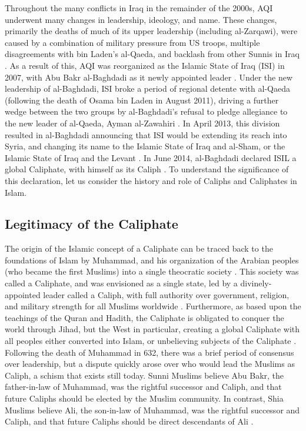 \documentclass{report}
\begin{document}
    Throughout the many conflicts in Iraq in the remainder of the 2000s, AQI underwent many changes in leadership, ideology, and name. These changes, primarily the deaths of much of its upper leadership (including al-Zarqawi), were caused by a combination of military pressure from US troops, multiple disagreements  with bin Laden's al-Qaeda, and backlash from other Sunnis in Iraq \cite{Zelin2014,Kahl2008}. As a result of this, AQI was reorganized as the Islamic State of Iraq (ISI) in 2007, with Abu Bakr al-Baghdadi as it newly appointed leader \cite{Zelin2014,Shadid2010}. Under the new leadership of al-Baghdadi, ISI broke a period of regional detente with al-Qaeda (following the death of Osama bin Laden in August 2011), driving a further wedge between the two groups by al-Baghdadi's refusal to pledge allegiance to the new leader of al-Qaeda, Ayman al-Zawahiri \cite{Al-Jawlani}. In April 2013, this division resulted in  al-Baghdadi announcing that ISI would be extending its reach into Syria, and changing its name to the Islamic State of Iraq and al-Sham, or the Islamic State of Iraq and the Levant \cite{Zelin2014,Al-Hussaini2013}. In June 2014, al-Baghdadi declared ISIL a global Caliphate, with himself as its Caliph \cite{Mortada2014,TheWeek2014}. To understand the significance of this declaration, let us consider the history and role of Caliphs and Caliphates in Islam.
    
    


\subsection{Legitimacy of the Caliphate}

The origin of the Islamic concept of a Caliphate can be traced back to the foundations of Islam by Muhammad, and his organization of the Arabian peoples (who became the first Muslims) into a single theocratic society  \cite{schmidt2004great,holt1977cambridge}. This society was called a Caliphate, and was envisioned as a single state, led by a divinely-appointed leader called a Caliph, with full authority over government, religion, and military strength for all Muslims worldwide \cite{lapidus2002history}. Furthermore, as based upon the teachings of the Quran and Hadith, the Caliphate is obligated to conquer the world through Jihad, but the West in particular, creating a global Caliphate with all peoples either converted into Islam, or unbelieving subjects of the Caliphate \cite{dawood2003koran,arabi2008divine,karsh2007islamic}. Following the death of Muhammad in 632, there was a brief period of consensus over leadership, but a dispute quickly arose over who would lead the Muslims as Caliph, a schism that exists still today. Sunni Muslims believe  Abu Bakr, the father-in-law of Muhammad, was the rightful successor and Caliph, and that future Caliphs should be elected by the Muslim community. In contrast, Shia Muslims believe  Ali, the son-in-law of Muhammad, was the rightful successor and Caliph, and that future Caliphs should be direct descendants of Ali \cite{karsh2007islamic,schmidt2004great}. 
\end{document}
